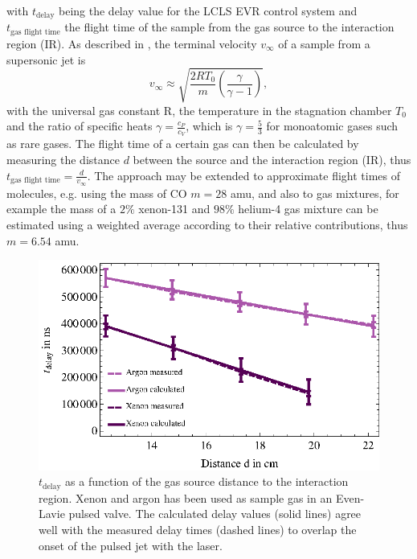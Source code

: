with $t_{\text{delay}}$ being the delay value for the LCLS EVR control system and $t_{\text{gas flight time}}$ the flight time of the sample from the gas source to the interaction region (IR). As described in \citep{Miller-1988-Oxford}, the terminal velocity $v_{\infty}$ of a sample from a supersonic jet is
\begin{equation}
 v_{\infty} \approx \sqrt{\frac{2 R T_{0}}{m} \left(\frac{\gamma}{\gamma - 1}\right)},
\label{eqn:terminal-velocity}
\end{equation}
with the universal gas constant R, the temperature in the stagnation chamber $T_{0}$ and the ratio of specific heats $\gamma = \frac{c_{P}}{c_{V}}$, which is $\gamma = \frac{5}{3}$ for monoatomic gases such as rare gases. The flight time of a certain gas can then be calculated by measuring the distance $d$ between the source and the interaction region (IR), thus $t_{\text{gas flight time}}=\frac{d}{v_{\infty}}$. The approach may be extended to approximate flight times of molecules, e.g. using the mass of CO $m=28$ amu, and also to gas mixtures, for example the mass of a $2\%$ xenon-131 and $98\%$ helium-4 gas mixture can be estimated using a weighted average according to their relative contributions, thus  $m = 6.54$ amu.\\
\begin{figure}
	\centering
		\includegraphics[width=1.00\textwidth]{images/gas-jet-flight-times.eps}
	\caption[Event receiver time delay at LCLS for supersonic gas jets.]{$t_{\text{delay}}$ as a function of the gas source distance to the interaction region. Xenon and argon has been used as sample gas in an Even-Lavie pulsed valve. The calculated delay values (solid lines) agree well with the measured delay times (dashed lines) to overlap the onset of the pulsed jet with the laser.}
	\label{fig:LCLS-delay-data}
\end{figure}
